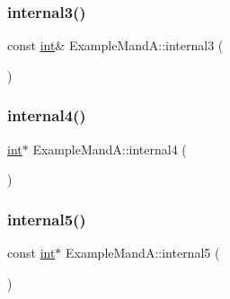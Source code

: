 \mbox{\label{class_example_mand_a_a1b889d9154bb0ced0e7006c618a0d2c1}} 
\subsubsection{\texorpdfstring{internal3()}{internal3()}}
{\footnotesize\ttfamily const \mbox{\hyperlink{warnings_8h_a74f207b5aa4ba51c3a2ad59b219a423b}{int}}\& Example\+Mand\+A\+::internal3 (\begin{DoxyParamCaption}{ }\end{DoxyParamCaption})\hspace{0.3cm}{\ttfamily [inline]}}

\mbox{\label{class_example_mand_a_af1f6f39da4a2c4e12248a1e66a5c3ba3}} 
\subsubsection{\texorpdfstring{internal4()}{internal4()}}
{\footnotesize\ttfamily \mbox{\hyperlink{warnings_8h_a74f207b5aa4ba51c3a2ad59b219a423b}{int}}$\ast$ Example\+Mand\+A\+::internal4 (\begin{DoxyParamCaption}{ }\end{DoxyParamCaption})\hspace{0.3cm}{\ttfamily [inline]}}

\mbox{\label{class_example_mand_a_a058ffc124e9fa46c67b784e648107d39}} 
\subsubsection{\texorpdfstring{internal5()}{internal5()}}
{\footnotesize\ttfamily const \mbox{\hyperlink{warnings_8h_a74f207b5aa4ba51c3a2ad59b219a423b}{int}}$\ast$ Example\+Mand\+A\+::internal5 (\begin{DoxyParamCaption}{ }\end{DoxyParamCaption})\hspace{0.3cm}{\ttfamily [inline]}}

\mbox{\label{class_example_mand_a_a16a516ceed6da440c47661dd71b32aec}} 

